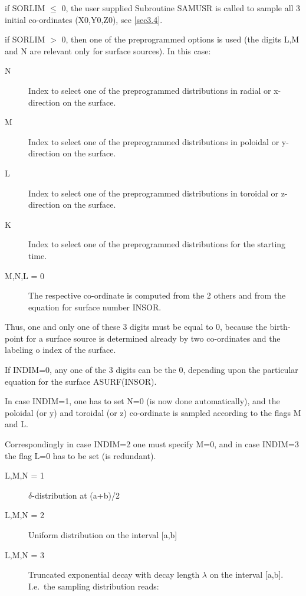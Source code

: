 \begin{description}
        if SORLIM $\le$ 0, the user supplied Subroutine SAMUSR is called to sample all
        3 initial co-ordinates (X0,Y0,Z0), see \cref{sec3.4}.

        if SORLIM $>$  0, then one of the preprogrammed options is used
        (the digits L,M and N are relevant only for surface sources).
        In this case:
        \begin{description}
          \item[N] Index to select one of the preprogrammed distributions in radial or
                x-direction on the surface.
          \item[M] Index to select one of the preprogrammed distributions in poloidal or
                y-direction on the surface.
          \item[L] Index to select one of the preprogrammed distributions in toroidal or
                z-direction on the surface.
          \item[K] Index to select one of the preprogrammed distributions for the
                starting time.
          \item[M,N,L = 0] The respective co-ordinate is computed from the 2 others and
                from the equation for surface number INSOR.
        \end{description}

        Thus, one and only one of these 3 digits must be equal to 0, because the
        birth-point for a surface source is determined already by two co-ordinates and
        the labeling							     o index of
        the surface.

        If INDIM=0, any one of the 3 digits can be the 0, depending upon the particular
        equation for the surface ASURF(INSOR).

        In case INDIM=1, one has to set N=0 (is now done automatically), and the
        poloidal (or y) and toroidal (or z) co-ordinate is sampled according to the
        flags M and L.

        Correspondingly in case  INDIM=2 one must specify M=0, and  in case INDIM=3 the
        flag L=0 has to be set (is redundant).

        \begin{description}
          \item[L,M,N = 1] $\delta$-distribution at (a+b)/2
          \item[L,M,N = 2] Uniform
                distribution on the interval [a,b]
          \item[L,M,N = 3] Truncated exponential decay
                with decay length $\lambda$  on the interval [a,b].
                I.e.\ the sampling distribution reads:


\end{description}
\end{description}
